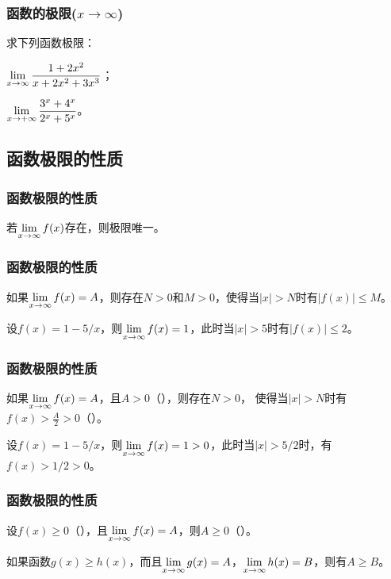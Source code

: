 \documentclass[14pt,notheorems,leqno,xcolor={rgb}]{beamer} %
\begin{document}
\begin{iframe}
\frametitle{函数的极限($x\to\infty$)}
\begin{exercise}
求下列函数极限：
\begin{enumlite}
  \item $\lim\limits_{x\to\infty}\dfrac{1+2x^2}{x+2x^2+3x^3}$；\pause
  \item $\lim\limits_{x\to+\infty}\dfrac{3^x+4^x}{2^x+5^x}$。
\end{enumlite}
\end{exercise}
\end{iframe}

\subsection{函数极限的性质}

\setcounter{property}{0}

\begin{iframe}
\frametitle{函数极限的性质}
\begin{property}[唯一性]
若$\lim\limits_{x\to\infty}f(x)$存在，则极限唯一。
\end{property}
\end{iframe}

\begin{iframe}
\frametitle{函数极限的性质}
\begin{property}[局部有界性]
如果$\lim\limits_{x\to\infty}f(x)=A$，则存在$N>0$和$M>0$，使得当$|x|>N$时有$|f(x)|\le M$。
\end{property}
\vpause
\begin{example*}
设$f(x)=1-5/x$，则$\lim\limits_{x\to\infty}f(x)=1$，\pause 此时当$|x|>5$时有$|f(x)|\le2$。
\end{example*}
\end{iframe}

\begin{iframe}
\frametitle{函数极限的性质}
\begin{property}[局部保号性]
如果$\lim\limits_{x\to\infty}f(x)=A$，且$A>0$（），则存在$N>0$，
使得当$|x|>N$时有$f(x)>\frac A2>0$（）。
\end{property}
\vpause
\begin{example*}
设$f(x)=1-5/x$，则$\lim\limits_{x\to\infty}f(x)=1>0$，\pause 此时当$|x|>5/2$时，有$f(x)>1/2>0$。
\end{example*}
\end{iframe}

\begin{frame}
\frametitle{函数极限的性质}
\begin{theorem*}[保号性]
设$f(x)\ge0$（），且$\lim\limits_{x\to\infty}f(x)=A$，则$A\ge0$（）。
\end{theorem*}
\vpause
\begin{corollary*}
如果函数$g(x)  \ge h(x)$，而且$\lim\limits_{x\to\infty}g(x)=A$，$\lim\limits_{x\to\infty}h(x)=B$，则有$A\ge B$。
\end{corollary*}
\end{frame}
\end{document}
